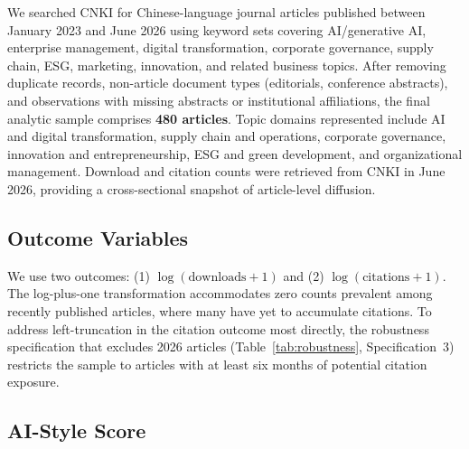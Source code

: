 \documentclass[12pt,a4paper]{article}
\begin{document}
We searched CNKI for Chinese-language journal articles published
between January 2023 and June 2026 using keyword sets covering
AI/generative AI, enterprise management, digital transformation,
corporate governance, supply chain, ESG, marketing, innovation,
and related business topics.
After removing duplicate records, non-article document types
(editorials, conference abstracts), and observations with missing
abstracts or institutional affiliations, the final analytic sample
comprises \textbf{480 articles}.
Topic domains represented include AI and digital transformation,
supply chain and operations, corporate governance, innovation and
entrepreneurship, ESG and green development, and organizational
management.
Download and citation counts were retrieved from CNKI in June 2026,
providing a cross-sectional snapshot of article-level diffusion.

\subsection{Outcome Variables}

We use two outcomes: (1) $\log(\text{downloads}+1)$ and
(2) $\log(\text{citations}+1)$.
The log-plus-one transformation accommodates zero counts prevalent
among recently published articles, where many have yet to accumulate
citations.
To address left-truncation in the citation outcome most directly,
the robustness specification that excludes 2026 articles
(Table~\ref{tab:robustness}, Specification~3) restricts the sample
to articles with at least six months of potential citation exposure.

\subsection{AI-Style Score}
\end{document}
